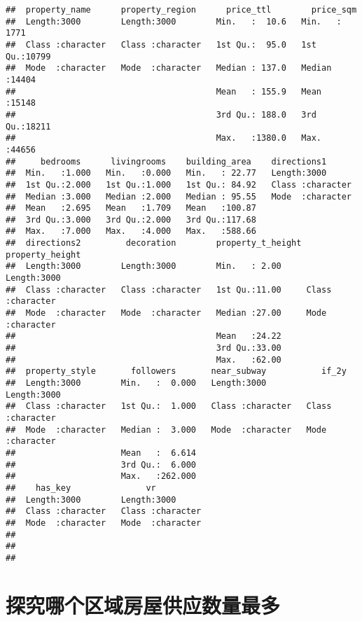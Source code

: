 \documentclass[
]{article}
\begin{document}
\begin{verbatim}
##  property_name      property_region      price_ttl        price_sqm    
##  Length:3000        Length:3000        Min.   :  10.6   Min.   : 1771  
##  Class :character   Class :character   1st Qu.:  95.0   1st Qu.:10799  
##  Mode  :character   Mode  :character   Median : 137.0   Median :14404  
##                                        Mean   : 155.9   Mean   :15148  
##                                        3rd Qu.: 188.0   3rd Qu.:18211  
##                                        Max.   :1380.0   Max.   :44656  
##     bedrooms      livingrooms    building_area    directions1       
##  Min.   :1.000   Min.   :0.000   Min.   : 22.77   Length:3000       
##  1st Qu.:2.000   1st Qu.:1.000   1st Qu.: 84.92   Class :character  
##  Median :3.000   Median :2.000   Median : 95.55   Mode  :character  
##  Mean   :2.695   Mean   :1.709   Mean   :100.87                     
##  3rd Qu.:3.000   3rd Qu.:2.000   3rd Qu.:117.68                     
##  Max.   :7.000   Max.   :4.000   Max.   :588.66                     
##  directions2         decoration        property_t_height property_height   
##  Length:3000        Length:3000        Min.   : 2.00     Length:3000       
##  Class :character   Class :character   1st Qu.:11.00     Class :character  
##  Mode  :character   Mode  :character   Median :27.00     Mode  :character  
##                                        Mean   :24.22                       
##                                        3rd Qu.:33.00                       
##                                        Max.   :62.00                       
##  property_style       followers       near_subway           if_2y          
##  Length:3000        Min.   :  0.000   Length:3000        Length:3000       
##  Class :character   1st Qu.:  1.000   Class :character   Class :character  
##  Mode  :character   Median :  3.000   Mode  :character   Mode  :character  
##                     Mean   :  6.614                                        
##                     3rd Qu.:  6.000                                        
##                     Max.   :262.000                                        
##    has_key               vr           
##  Length:3000        Length:3000       
##  Class :character   Class :character  
##  Mode  :character   Mode  :character  
##                                       
##                                       
## 
\end{verbatim}

\section{探究哪个区域房屋供应数量最多}\label{ux63a2ux7a76ux54eaux4e2aux533aux57dfux623fux5c4bux4f9bux5e94ux6570ux91cfux6700ux591a}
\end{document}
